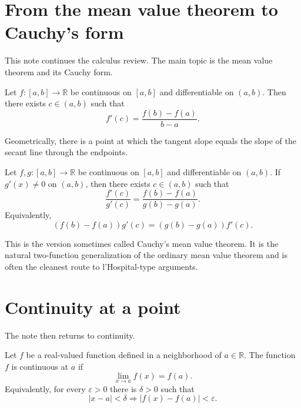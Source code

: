 
\section{From the mean value theorem to Cauchy's form}

This note continues the calculus review.  The main topic is the mean value theorem and its Cauchy form.

\begin{theorem}
Let \(f:[a,b]\to\mathbb R\) be continuous on \([a,b]\) and differentiable on \((a,b)\).  Then there exists \(c\in(a,b)\) such that
\[
  f'(c)=\frac{f(b)-f(a)}{b-a}.
\]
\end{theorem}

Geometrically, there is a point at which the tangent slope equals the slope of the secant line through the endpoints.

\begin{theorem}
Let \(f,g:[a,b]\to\mathbb R\) be continuous on \([a,b]\) and differentiable on \((a,b)\).  If \(g'(x)\neq0\) on \((a,b)\), then there exists \(c\in(a,b)\) such that
\[
  \frac{f'(c)}{g'(c)}=\frac{f(b)-f(a)}{g(b)-g(a)}.
\]
Equivalently,
\[
  (f(b)-f(a))g'(c)=(g(b)-g(a))f'(c).
\]
\end{theorem}

\begin{remark}
This is the version sometimes called Cauchy's mean value theorem.  It is the natural two-function generalization of the ordinary mean value theorem and is often the cleanest route to l'Hospital-type arguments.
\end{remark}

\section{Continuity at a point}

The note then returns to continuity.

\begin{definition}
Let \(f\) be a real-valued function defined in a neighborhood of \(a\in\mathbb R\).  The function \(f\) is continuous at \(a\) if
\[
  \lim_{x\to a}f(x)=f(a).
\]
Equivalently, for every \(\varepsilon>0\) there is \(\delta>0\) such that
\[
  |x-a|<\delta\Rightarrow |f(x)-f(a)|<\varepsilon.
\]
\end{definition}


